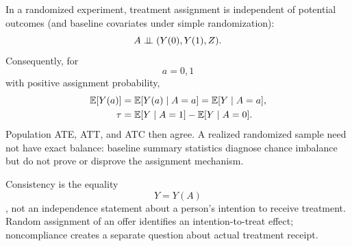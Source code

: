 In a randomized experiment, treatment assignment is independent of potential outcomes (and baseline covariates under simple randomization):
\begin{equation}
A\mathrel{\perp\!\!\!\perp} (Y(0),Y(1),Z).
\end{equation}
Consequently, for $$a=0,1$$ with positive assignment probability,
\begin{align}
\mathbb E[Y(a)]&=\mathbb E[Y(a)\mid A=a]=\mathbb E[Y\mid A=a],\\
\tau&=\mathbb E[Y\mid A=1]-\mathbb E[Y\mid A=0].
\end{align}
Population ATE, ATT, and ATC then agree. A realized randomized sample need not have exact balance: baseline summary statistics diagnose chance imbalance but do not prove or disprove the assignment mechanism.
\begin{correction}
Consistency is the equality $$Y=Y(A)$$, not an independence statement about a person's intention to receive treatment. Random assignment of an offer identifies an intention-to-treat effect; noncompliance creates a separate question about actual treatment receipt.
\end{correction}

